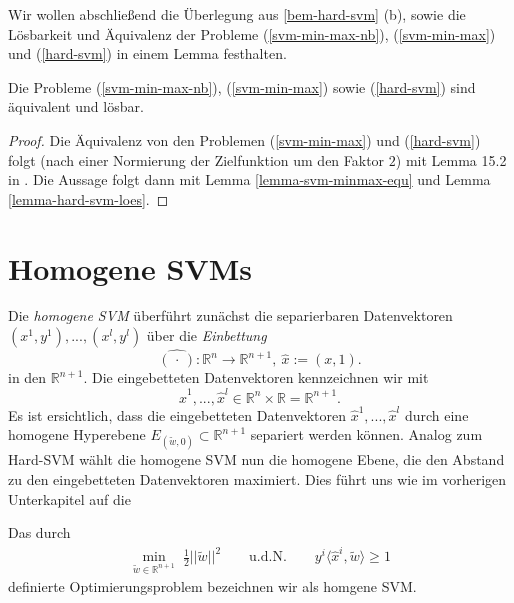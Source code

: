 Wir wollen abschließend die Überlegung aus \ref{bem-hard-svm} (b), sowie die Lösbarkeit und Äquivalenz der Probleme (\ref{svm-min-max-nb}), (\ref{svm-min-max}) und (\ref{hard-svm}) in einem Lemma festhalten.

\begin{lemma}
	\label{lemma-svm-prob-aequ}
	Die Probleme (\ref{svm-min-max-nb}), (\ref{svm-min-max}) sowie (\ref{hard-svm}) sind äquivalent und lösbar.
\end{lemma}
\begin{proof}
	Die Äquivalenz von den Problemen (\ref{svm-min-max}) und (\ref{hard-svm}) folgt (nach einer Normierung der Zielfunktion um den Faktor $2$) mit Lemma 15.2 in \cite{sb-umlfta}. Die Aussage folgt dann mit Lemma \ref{lemma-svm-minmax-equ} und Lemma \ref{lemma-hard-svm-loes}.
\end{proof}

\section{Homogene SVMs}
Die \emph{homogene SVM} überführt zunächst die separierbaren Datenvektoren $(x^1,y^1),...,(x^l,y^l)$ über die \emph{Einbettung}
$$
\widehat{(\, \cdot \, )} : \mathbb{R}^n \rightarrow \mathbb{R}^{n+1},\ \hat{x} := (x,1).
$$
in den $\mathbb{R}^{n+1}$. Die eingebetteten Datenvektoren kennzeichnen wir mit
$$
\hat{x}^1,...,\hat{x}^l \in \mathbb{R}^n \times \mathbb{R} = \mathbb{R}^{n+1}.
$$
Es ist ersichtlich, dass die eingebetteten Datenvektoren $\hat{x}^1,...,\hat{x}^l$ durch eine homogene Hyperebene $E_{(\tilde{w},0)} \subset \mathbb{R}^{n+1}$ separiert werden können. Analog zum Hard-SVM wählt die homogene SVM nun die homogene Ebene, die den Abstand zu den eingebetteten Datenvektoren maximiert. Dies führt uns wie im vorherigen Unterkapitel auf die

\begin{definition}
Das durch 
\begin{equation}
\label{equ-homog-svm}
\begin{aligned}
	\min_{\tilde{w} \in \mathbb{R}^{n+1}} \; \frac{1}{2} ||\tilde{w}||^2 \qquad
	\text{u.d.N.} \qquad  
	y^i \langle \hat{x}^i, \tilde{w} \rangle \geq 1
\end{aligned}
\end{equation}
definierte Optimierungsproblem bezeichnen wir als homgene SVM.
\end{definition}

